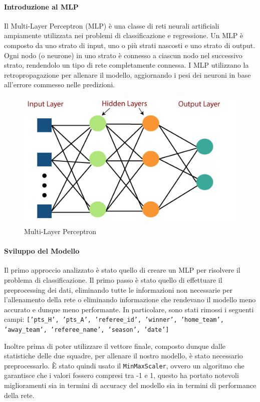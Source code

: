 \paragraph{Introduzione al MLP}
Il Multi-Layer Perceptron (MLP) è una classe di reti neurali artificiali ampiamente utilizzata nei problemi di classificazione e regressione. Un MLP è composto da uno strato di input, uno o più strati nascosti e uno strato di output. Ogni nodo (o neurone) in uno strato è connesso a ciascun nodo nel successivo strato, rendendolo un tipo di rete completamente connessa. I MLP utilizzano la retropropagazione per allenare il modello, aggiornando i pesi dei neuroni in base all'errore commesso nelle predizioni.
\begin{figure}[H]
    \centering
    \includegraphics[width=0.3\linewidth]{img/multi-layer-perceptron-in-tensorflow.png}
    \caption{Multi-Layer Perceptron}
    \label{fig:enter-label}
\end{figure}

\paragraph{Sviluppo del Modello}
Il primo approccio analizzato è stato quello di creare un MLP per risolvere il problema di classificazione. Il primo passo è stato quello di effettuare il preprocessing dei dati, eliminando tutte le informazioni non necessarie per l'allenamento della rete o eliminando informazione che rendevano il modello meno accurato e dunque meno performante. In particolare, sono stati rimossi i seguenti campi: \newline
\texttt{['pts\_H', 'pts\_A', 'referee\_id', 'winner', 'home\_team', 'away\_team', 'referee\_name', \newline
'season', 'date']}

Inoltre prima di poter utilizzare il vettore finale, composto dunque dalle statistiche delle due squadre, per allenare il nostro modello, è stato necessario preprocessarlo. È stato quindi usato il \texttt{MinMaxScaler}, ovvero un algoritmo che garantisce che i valori fossero compresi tra -1 e 1, questo ha portato notevoli miglioramenti sia in termini di accuracy del modello sia in termini di performance della rete.


